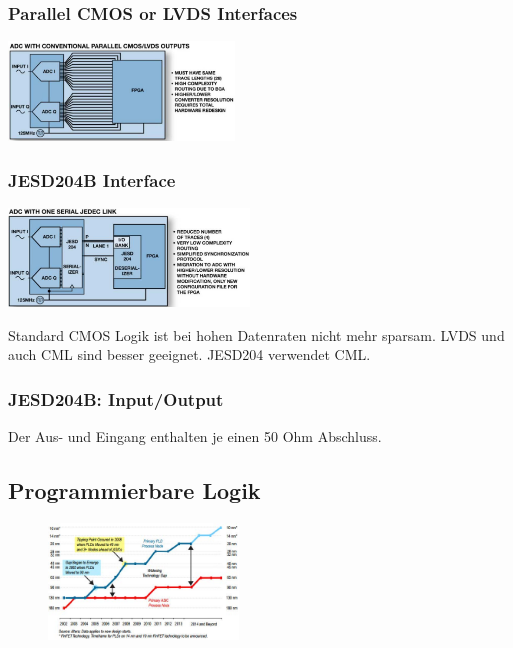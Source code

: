 \begin{multicols}{2}
    \subsubsection{Parallel CMOS or LVDS Interfaces}
    \includegraphics[width=0.45\textwidth]{images/adc_conventional}

    \subsubsection{JESD204B Interface}
    \includegraphics[width=0.48\textwidth]{images/adc_jesd}
\end{multicols}
Standard CMOS Logik ist bei hohen Datenraten nicht mehr sparsam. LVDS und auch CML sind besser geeignet. JESD204 verwendet CML.

\subsubsection{JESD204B: Input/Output}
Der Aus- und Eingang enthalten je einen 50 Ohm Abschluss.

\subsection{Programmierbare Logik}
\begin{figure}
    \hspace{-60pt}
    \centering
    \includegraphics[width=0.45\textwidth]{images/fpga_technology}
\end{figure}
